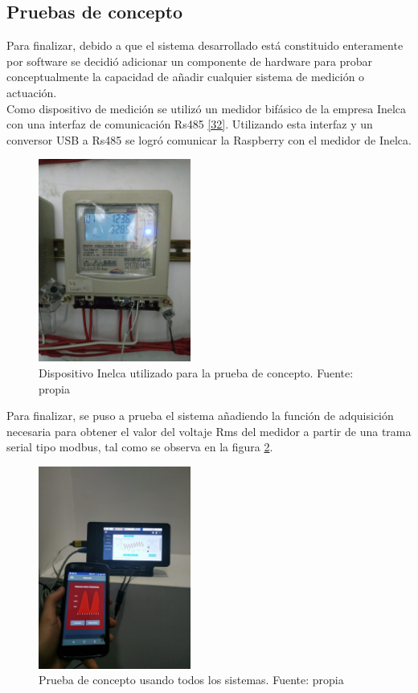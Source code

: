 \subsection{Pruebas de concepto}
Para finalizar, debido a que el sistema desarrollado está constituido enteramente por software se decidió adicionar un componente de hardware para probar conceptualmente la capacidad de añadir cualquier sistema de medición o actuación.
\vspace{0.5cm}\\
Como dispositivo de medición se utilizó un medidor bifásico de la empresa Inelca con una interfaz de comunicación Rs485 \ref{32}. Utilizando esta interfaz y un conversor USB a Rs485 se logró comunicar la Raspberry con el medidor de Inelca.
\vspace{0.5cm}\\
\begin{figure}[htbp]
	\centerline{\includegraphics[width=5cm]{./figuras/concepto_1.png}}
	\caption{Dispositivo Inelca utilizado para la prueba de concepto. Fuente: propia}
	\label{fig_32}
\end{figure}

Para finalizar, se puso a prueba el sistema añadiendo la función de adquisición necesaria para obtener el valor del voltaje Rms del medidor a partir de una trama serial tipo modbus, tal como se observa en la figura \ref{fig_33}.

\begin{figure}[htbp]
	\centerline{\includegraphics[width=5cm]{./figuras/concepto_2.png}}
	\caption{Prueba de concepto usando todos los sistemas. Fuente: propia}
	\label{fig_33}
\end{figure}
